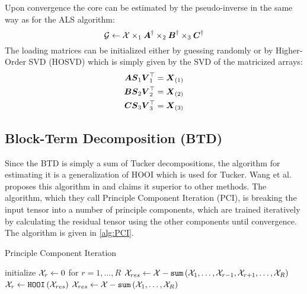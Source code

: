 Upon convergence the core can be estimated by the pseudo-inverse in the same way as for the ALS algorithm:
\begin{equation}
    \mathcal{G} \leftarrow \mathcal{X} \times_1 \boldsymbol{A}^{\dagger} \times_2 \boldsymbol{B}^{\dagger} \times_3 \boldsymbol{C}^{\dagger}
\end{equation}
The loading matrices can be initialized either by guessing randomly or by Higher-Order SVD (HOSVD) which is simply given by the SVD of the matricized arrays:
\begin{align}
    \boldsymbol{A} \boldsymbol{S}_1\boldsymbol{V}_1^{\top} &= \boldsymbol{X}_{(1)} \\
    \boldsymbol{B} \boldsymbol{S}_2\boldsymbol{V}_2^{\top} &= \boldsymbol{X}_{(2)} \\
    \boldsymbol{C} \boldsymbol{S}_3\boldsymbol{V}_3^{\top} &= \boldsymbol{X}_{(3)}
\end{align}

\subsection{Block-Term Decomposition (BTD)}
Since the BTD is simply a sum of Tucker decompositions, the algorithm for estimating it is a generalization of HOOI which is used for Tucker. Wang et al. proposes this algorithm in \cite{Wang2016} and claims it superior to other methods. The algorithm, which they call Principle Component Iteration (PCI), is breaking the input tensor into a number of principle components, which are trained iteratively by calculating the residual tensor using the other components until convergence. The algorithm is given in \autoref{alg:PCI}.
\begin{algorithm} \caption{Principle Component Iteration} \label{alg:PCI}
\begin{algorithmic}[1]
\State initialize $\mathcal{X}_r \leftarrow 0$ for $r = 1, \dots, R$
\Repeat
        \State $\mathcal{X}_{res} \leftarrow \mathcal{X} - \texttt{sum}\left( \mathcal{X}_1, \dots, \mathcal{X}_{r-1}, \mathcal{X}_{r+1},\dots, \mathcal{X}_R \right)$ 
        \State $\mathcal{X}_r \leftarrow \texttt{HOOI} \left( \mathcal{X}_{res}\right)$ 
    \EndFor
    \State $\mathcal{X}_{res} \leftarrow \mathcal{X} - \texttt{sum}\left( \mathcal{X}_1, \dots, \mathcal{X}_R \right)$
\State {}
\EndProcedure
\end{algorithmic}
\end{algorithm}

